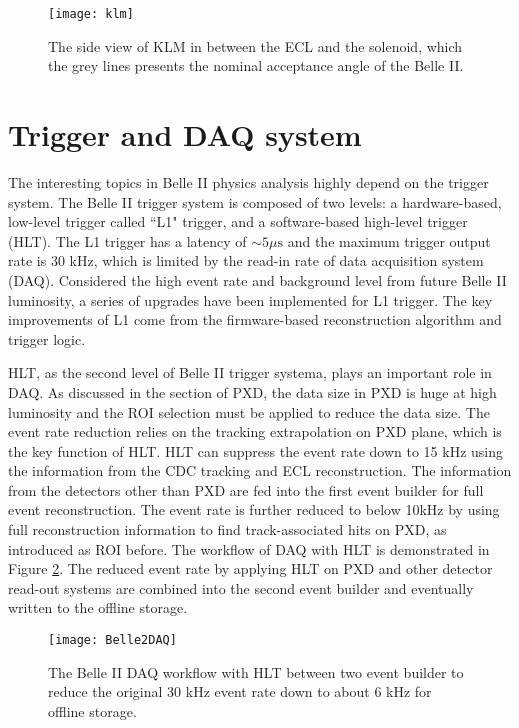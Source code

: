 \begin{figure}[htbp]
	\centering
\texttt{[image: klm]}
\caption{The side view of KLM in between the ECL and the solenoid, which the grey lines presents the nominal acceptance angle of the Belle II\cite{Abe:2010gxa}. }
\label{fig:klm}
\end{figure}




\section{Trigger and DAQ system}
The interesting topics in Belle II physics analysis highly depend on the trigger system. The Belle II trigger system is composed of two levels: a hardware-based, low-level trigger called ``L1" trigger, and a software-based high-level trigger (HLT). The L1 trigger has a latency of $\sim 5 \mu\text{s}$ and the maximum trigger output rate is 30 kHz, which is limited by the read-in rate of data acquisition system (DAQ). Considered the high event rate and background level from future Belle II luminosity, a series of upgrades have been implemented for L1 trigger. The key improvements of L1 come from the firmware-based reconstruction algorithm and trigger logic.

HLT, as the second level of Belle II trigger systema, plays an important role in DAQ. As discussed in the section of PXD, the data size in PXD is huge at high luminosity and the ROI selection must be applied to reduce the data size. The event rate reduction relies on the tracking extrapolation on PXD plane, which is the key function of HLT. HLT can suppress the event rate down to 15 kHz using the information from the CDC tracking and ECL reconstruction. The information from the detectors other than PXD are fed into the first event builder for full event reconstruction. The event rate is further reduced to below 10kHz by using full reconstruction information to find track-associated hits on PXD, as introduced as ROI before. The workflow of DAQ with HLT is demonstrated in Figure \ref{fig:daq}. The reduced event rate by applying HLT on PXD and other detector read-out systems are combined into the second event builder and eventually written to the offline storage. 

\begin{figure}[htbp]
	\centering
	\texttt{[image: Belle2DAQ]}
	\caption{The Belle II DAQ workflow with HLT between two event builder to reduce the original 30 kHz event rate down to about 6 kHz for offline storage.}
	\label{fig:daq}
\end{figure}


